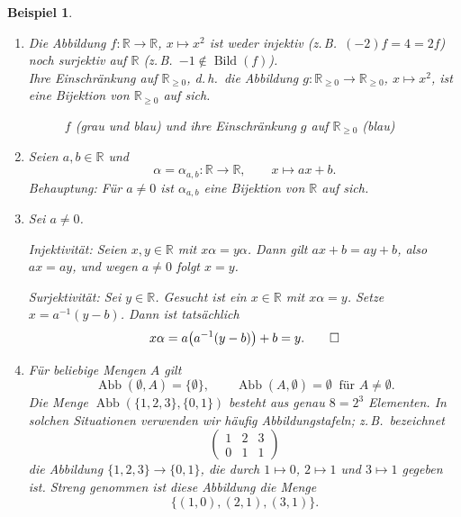 \documentclass[a4paper]{article}
\makeatletter
\theoremstyle{kurzskript}
\newtheorem{beispiel}[satz]{Beispiel}
\renewenvironment{proof}[1][\proofname]{\par\pushQED{\qed}%
  \normalfont\topsep\medskipamount\relax
  \trivlist\item[\hskip\labelsep\bfseries #1\@addpunct{.}]\ignorespaces}%
  {\popQED\endtrivlist\@endpefalse}
\renewcommand{\proofname}{Beweis}
\newcommand{\R}{\mathbb{R}}
\makeatother
\begin{document}
\begin{beispiel}
\leavevmode
\begin{enumerate}[label=(\alph*)]
  \item Die Abbildung $f\colon \R \to \R$, $x \mapsto x^2$ ist weder injektiv (z.\,B.\ $(-2)f = 4 = 2f$) noch surjektiv auf $\R$ (z.\,B.\ $-1 \notin \operatorname{Bild}(f)$). \\
  Ihre Einschränkung auf $\R_{\geq 0}$, d.\,h.\ die Abbildung $g\colon \R_{\geq 0} \to \R_{\geq 0}$, $x \mapsto x^2$, ist eine Bijektion von $\R_{\geq 0}$ auf sich.
  \begin{figure}[H]
  \centering
  \caption{$f$ (grau und blau) und ihre Einschränkung $g$ auf $\R_{\geq 0}$ (blau)}
  \end{figure}

  \item Seien $a, b \in \R$ und
  \[
    \alpha = \alpha_{a, b}\colon \R \to \R, \qquad x \mapsto ax + b.
  \]
  \emph{Behauptung:} Für $a \neq 0$ ist $\alpha_{a, b}$ eine Bijektion von $\R$ auf sich.
  \begin{proof}
  Sei $a \neq 0$.

  \emph{Injektivität:} Seien $x, y \in \R$ mit $x\alpha = y\alpha$. Dann gilt $ax + b = ay + b$, also $ax = ay$, und wegen $a \neq 0$ folgt $x = y$.

  \emph{Surjektivität:} Sei $y \in \R$. Gesucht ist ein $x \in \R$ mit $x\alpha = y$. Setze $x = a^{-1}(y - b)$. Dann ist tatsächlich
  \[
    x\alpha = a\bigl(a^{-1}(y - b)\bigr) + b = y. \qedhere
  \]
  \end{proof}

  \item Für beliebige Mengen $A$ gilt
  \[
    \operatorname{Abb}(\emptyset, A) = \{\emptyset\}, \qquad \operatorname{Abb}(A, \emptyset) = \emptyset \ \text{ für } A \neq \emptyset.
  \]
  Die Menge $\operatorname{Abb}(\{1, 2, 3\}, \{0, 1\})$ besteht aus genau $8 = 2^3$ Elementen. In solchen Situationen verwenden wir häufig \emph{Abbildungstafeln}; z.\,B.\ bezeichnet
  \[
    \begin{pmatrix} 1 & 2 & 3 \\ 0 & 1 & 1 \end{pmatrix}
  \]
  die Abbildung $\{1, 2, 3\} \to \{0, 1\}$, die durch $1 \mapsto 0$, $2 \mapsto 1$ und $3 \mapsto 1$ gegeben ist. Streng genommen ist diese Abbildung die Menge
  \[
    \{(1, 0), (2, 1), (3, 1)\}.
  \]


\end{enumerate}
\end{beispiel}
\end{document}
